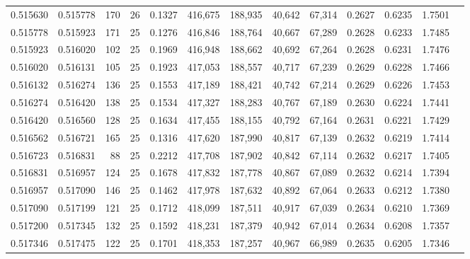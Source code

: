 \begin{tabular}{rrrrrrrrrrrrr}
0.515630 & 0.515778 &   170 &  26 &                                     0.1327 & 416,675 & 188,935 &  40,642 &  67,314 & 0.2627 & 0.6235 & 1.7501 \\
0.515778 & 0.515923 &   171 &  25 &                                     0.1276 & 416,846 & 188,764 &  40,667 &  67,289 & 0.2628 & 0.6233 & 1.7485 \\
0.515923 & 0.516020 &   102 &  25 &                                     0.1969 & 416,948 & 188,662 &  40,692 &  67,264 & 0.2628 & 0.6231 & 1.7476 \\
0.516020 & 0.516131 &   105 &  25 &                                     0.1923 & 417,053 & 188,557 &  40,717 &  67,239 & 0.2629 & 0.6228 & 1.7466 \\
0.516132 & 0.516274 &   136 &  25 &                                     0.1553 & 417,189 & 188,421 &  40,742 &  67,214 & 0.2629 & 0.6226 & 1.7453 \\
0.516274 & 0.516420 &   138 &  25 &                                     0.1534 & 417,327 & 188,283 &  40,767 &  67,189 & 0.2630 & 0.6224 & 1.7441 \\
0.516420 & 0.516560 &   128 &  25 &                                     0.1634 & 417,455 & 188,155 &  40,792 &  67,164 & 0.2631 & 0.6221 & 1.7429 \\
0.516562 & 0.516721 &   165 &  25 &                                     0.1316 & 417,620 & 187,990 &  40,817 &  67,139 & 0.2632 & 0.6219 & 1.7414 \\
0.516723 & 0.516831 &    88 &  25 &                                     0.2212 & 417,708 & 187,902 &  40,842 &  67,114 & 0.2632 & 0.6217 & 1.7405 \\
0.516831 & 0.516957 &   124 &  25 &                                     0.1678 & 417,832 & 187,778 &  40,867 &  67,089 & 0.2632 & 0.6214 & 1.7394 \\
0.516957 & 0.517090 &   146 &  25 &                                     0.1462 & 417,978 & 187,632 &  40,892 &  67,064 & 0.2633 & 0.6212 & 1.7380 \\
0.517090 & 0.517199 &   121 &  25 &                                     0.1712 & 418,099 & 187,511 &  40,917 &  67,039 & 0.2634 & 0.6210 & 1.7369 \\
0.517200 & 0.517345 &   132 &  25 &                                     0.1592 & 418,231 & 187,379 &  40,942 &  67,014 & 0.2634 & 0.6208 & 1.7357 \\
0.517346 & 0.517475 &   122 &  25 &                                     0.1701 & 418,353 & 187,257 &  40,967 &  66,989 & 0.2635 & 0.6205 & 1.7346 \\

\end{tabular}
